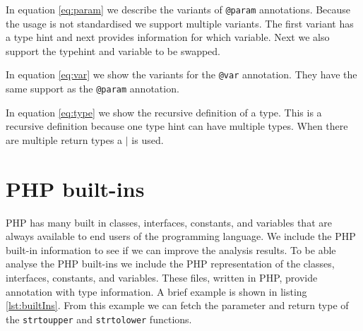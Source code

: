 \documentclass[../main.tex]{subfiles}
\begin{document}
	In equation \ref{eq:param} we describe the variants of \texttt{@param} annotations.
	Because the usage is not standardised we support multiple variants.
	The first variant has a type hint and next provides information for which variable.
	Next we also support the typehint and variable to be swapped.
	
	In equation \ref{eq:var} we show the variants for the \texttt{@var} annotation.
	They have the same support as the \texttt{@param} annotation.
	
	In equation \ref{eq:type} we show the recursive definition of a type.
	This is a recursive definition because one type hint can have multiple types.
	When there are multiple return types a $\vert{}$ is used.

	\section{PHP built-ins}\label{sec:design_php_built_ins}
	PHP has many built in classes, interfaces, constants, and variables that are always available to end users of the programming language.
	We include the PHP built-in information to see if we can improve the analysis results.
	To be able analyse the PHP built-ins we include the PHP representation of the classes, interfaces, constants, and variables.
	These files, written in PHP, provide annotation with type information.
	A brief example is shown in listing \ref{lst:builtIns}.
	From this example we can fetch the parameter and return type of the \texttt{strtoupper} and \texttt{strtolower} functions.
	
	
	
\end{document}
